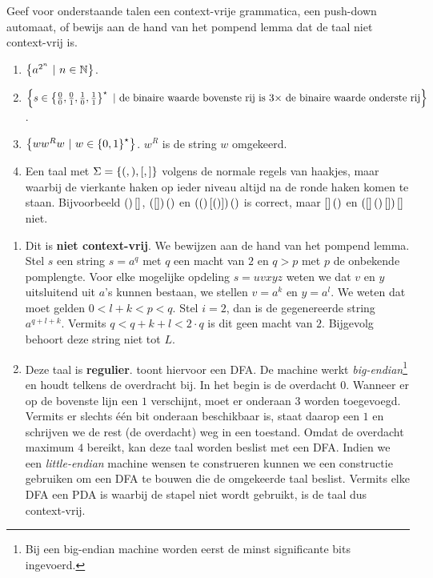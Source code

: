 \documentclass{article}
\begin{document}
\begin{question}
Geef voor onderstaande talen een context-vrije grammatica, een
push-down automaat, of bewijs aan de hand van het pompend lemma dat de
taal niet context-vrij is.
\begin{enumerate}
 \item $\left\{ a^{2^n}\ |\ n\in\mathbb{N} \right\}$.
 \item $\left\{ s\in\left\{ \tfrac{0}{0},\tfrac{0}{1},\tfrac{1}{0},\tfrac{1}{1} \right\}^{\star}\ |\ \mbox{de binaire waarde bovenste rij is $3\times$ de binaire waarde onderste rij} \right\}$.
 \item $\left\{ ww^Rw\ |\ w\in\left\{ 0,1 \right\}^{\star} \right\}$. $w^R$ is de string $w$ omgekeerd.
 \item Een taal met $\Sigma=\left\{ (,),[,] \right\}$ volgens de normale regels
van haakjes, maar waarbij de vierkante haken op ieder niveau altijd na
de ronde haken komen te staan. Bijvoorbeeld $\left(  \right)\left[  \right]$,
$\left( \left[  \right] \right){\left(  \right)}$ en $\left( \left(  \right)\left[ \left(  \right) \right] \right)\left(  \right)$ is
correct, maar $\left[  \right]\left(  \right)$ en
$\left( \left[  \right]\left(  \right)\left[  \right] \right)\left[  \right]$ niet.
\end{enumerate}
\begin{answer}
\begin{enumerate}
 \item Dit is \textbf{niet context-vrij}. We bewijzen aan de hand van het pompend lemma. Stel $s$ een string $s=a^q$ met $q$ een macht van $2$ en $q>p$ met $p$ de onbekende pomplengte. Voor elke mogelijke opdeling $s=uvxyz$ weten we dat $v$ en $y$ uitsluitend uit $a$'s kunnen bestaan, we stellen $v=a^k$ en $y=a^l$. We weten dat moet gelden $0<l+k<p<q$. Stel $i=2$, dan is de gegenereerde string $a^{q+l+k}$. Vermits $q<q+k+l<2\cdot q$ is dit geen macht van $2$. Bijgevolg behoort deze string niet tot $L$.
 \item Deze taal is \textbf{regulier}.  toont hiervoor een DFA. De machine werkt \emph{big-endian}\footnote{Bij een big-endian machine worden eerst de minst significante bits ingevoerd.} en houdt telkens de overdracht bij. In het begin is de overdacht $0$. Wanneer er op de bovenste lijn een $1$ verschijnt, moet er onderaan $3$ worden toegevoegd. Vermits er slechts \'e\'en bit onderaan beschikbaar is, staat daarop een $1$ en schrijven we de rest (de overdacht) weg in een toestand. Omdat de overdacht maximum $4$ bereikt, kan deze taal worden beslist met een DFA. Indien we een \emph{little-endian} machine wensen te construeren kunnen we een constructie gebruiken om een DFA te bouwen die de omgekeerde taal beslist. Vermits elke DFA een PDA is waarbij de stapel niet wordt gebruikt, is de taal dus context-vrij.\\

\end{enumerate}
\end{answer}
\end{question}
\end{document}
